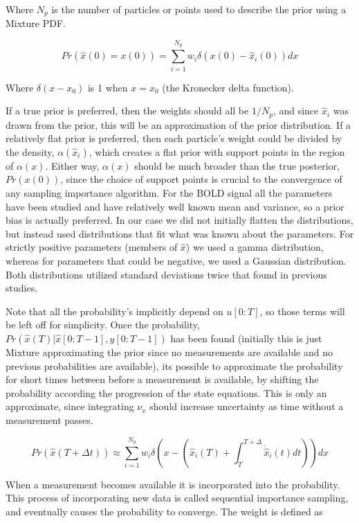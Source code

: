 \documentclass{article}
\begin{document}
Where $N_p$ is the number of particles or points used to describe the prior 
using a Mixture PDF. 

\begin{equation}
Pr(\hat{x}(0) = x(0)) = \sum_{i=1}^{N_p} w_i\delta(x(0) - \hat{x}_i(0) ) dx
\end{equation}

Where $\delta(x-x_0)$ is 1 when $x = x_0$ (the Kronecker delta function).

If a true prior is preferred, then the weights
should all be $1/N_p$, and since $\hat{x}_i$ was drawn from the prior, this will
be an approximation of the prior distribution. If a relatively flat prior is 
preferred, then each particle's weight could be divided by the density, $\alpha(\hat{x}_i)$,
which creates a flat prior with support points in the region of $\alpha(x)$. Either
way, $\alpha(x)$ should be much broader than the true posterior, $Pr(x(0))$, since the
choice of support points is crucial to the convergence of any sampling importance
algorithm. 
For the BOLD signal all the parameters have been studied and have relatively well
known mean and variance, so a prior bias is actually preferred. In our
case we did not initially flatten the distributions, but instead used 
distributions that fit what was known about the parameters.  
For strictly positive parameters (members of $\hat{x}$) we used a gamma distribution,
whereas for parameters that could be negative, we used a Gaussian distribution. Both
distributions utilized standard deviations twice that found in previous studies.

Note that all the probability's implicitly depend on $u[0:T]$, so those terms 
will be left off for simplicity.
Once the probability, $Pr(\hat{x}(T) | \hat{x}[0:T-1], y[0:T-1])$ has been found
(initially this is just Mixture approximating the prior since no measurements are 
available and no previous probabilities are available), its possible to approximate
the probability for short times between before a measurement is available, by shifting
the probability according the progression of the state equations. This is only 
an approximate, since integrating $\nu_x$ should increase uncertainty as
time without a measurement passes. 

\begin{equation}
Pr(\hat{x}(T+\Delta t)) \approx 
\sum_{i=1}^{N_p} w_i\delta\left(x - (\hat{x}_i(T) + \int_T^{T+\Delta} \dot{\hat{x}}_i(t) dt) \right) dx
\end{equation}

When a measurement becomes available it is incorporated into the probability.
This process of incorporating new data is called sequential importance sampling,
and eventually causes the probability to converge. The weight is defined
as
\end{document}
